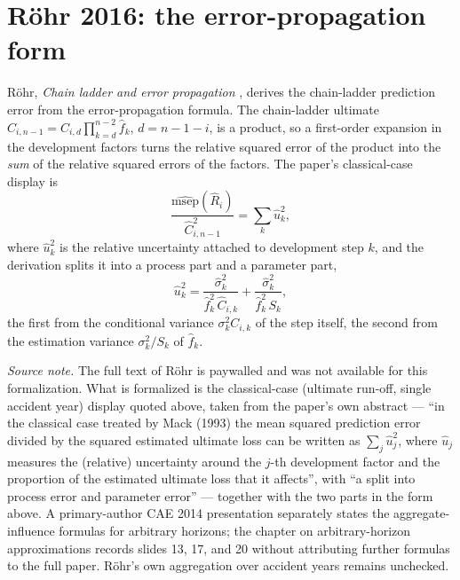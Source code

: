 
\chapter{R\"ohr 2016: the error-propagation form}

R\"ohr, \emph{Chain ladder and error propagation} \cite{Rohr2016},
derives the chain-ladder prediction error from the error-propagation formula. The
chain-ladder ultimate $\hat C_{i,n-1} = C_{i,d}\prod_{k=d}^{n-2}\hat f_k$, $d = n-1-i$,
is a product, so a first-order expansion in the development factors turns the relative
squared error of the product into the \emph{sum} of the relative squared errors of the
factors. The paper's classical-case display is
\[
  \frac{\widehat{\mathrm{msep}}(\hat R_i)}{\hat C_{i,n-1}^2} = \sum_k \hat u_k^2 ,
\]
where $\hat u_k^2$ is the relative uncertainty attached to development step $k$, and the
derivation splits it into a process part and a parameter part,
\[
  \hat u_k^2
   = \frac{\hat\sigma_k^2}{\hat f_k^2\,\hat C_{i,k}}
   + \frac{\hat\sigma_k^2}{\hat f_k^2\,S_k},
\]
the first from the conditional variance $\sigma_k^2 C_{i,k}$ of the step itself, the second
from the estimation variance $\sigma_k^2/S_k$ of $\hat f_k$.

\emph{Source note.} The full text of R\"ohr \cite{Rohr2016} is paywalled and was not available for
this formalization. What is formalized is the classical-case (ultimate run-off, single
accident year) display quoted above, taken from the paper's own abstract --- ``in the
classical case treated by Mack (1993) the mean squared prediction error divided by the
squared estimated ultimate loss can be written as $\sum_j \hat u_j^2$, where $\hat u_j$
measures the (relative) uncertainty around the $j$-th development factor and the proportion
of the estimated ultimate loss that it affects'', with ``a split into process error and
parameter error'' --- together with the two parts in the form above. A primary-author CAE
2014 presentation separately states the aggregate-influence formulas for arbitrary horizons;
the chapter on arbitrary-horizon approximations records slides 13, 17, and 20 without
attributing further formulas to the full paper. R\"ohr's own aggregation over accident years
remains unchecked.

